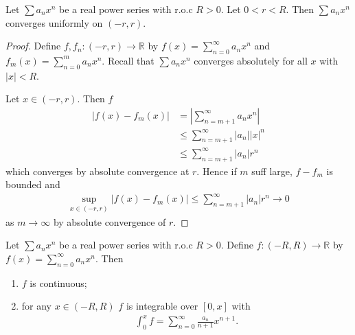     \begin{lemma} \label{lem:8}
        Let $\sum a_n x^n$ be a real power series with r.o.c $R > 0$.
        Let $0 < r < R$.
        Then $\sum a_n x^n$ converges uniformly on $(-r, r)$.
    \end{lemma} 

    \begin{proof}
        Define $f, f_n : (-r, r) \to \mathbb{R}$ by $f(x) = \sum_{n=0}^{\infty} a_n x^n$ and $f_m(x) = \sum_{n=0}^{m} a_n x^n$.
        Recall that $\sum a_n x^n$ converges absolutely for all $x$ with $|x| < R$.

        Let $x \in (-r, r)$.
        Then $f$
        \begin{align*}
            |f(x) - f_m(x)| &= \left| \sum_{n=m+1}^{\infty} a_n x^n \right| \\
            &\leq \sum_{n=m+1}^{\infty} |a_n| |x|^n \\
            &\leq \sum_{n=m+1}^{\infty} |a_n| r^n
        \end{align*} which converges by absolute convergence at $r$.
        Hence if $m$ suff large, $f - f_m$ is bounded and 
        \begin{align*}
            \sup_{x \in (-r, r)} |f(x) - f_m(x)| \leq \sum_{n=m+1}^{\infty} |a_n| r^n \to 0
        \end{align*} as $m \to \infty$ by absolute convergence of $r$.
    \end{proof} 

    \begin{theorem} \label{thm:9}
        Let $\sum a_n x^n$ be a real power series with r.o.c $R > 0$.
        Define $f : (-R, R) \to \mathbb{R}$ by $f(x) = \sum_{n=0}^{\infty} a_n x^n$.
        Then 
        \begin{enumerate}
            \item $f$ is continuous;
            \item for any $x \in (-R, R)$ $f$ is integrable over $[0, x]$ with 
            \begin{align*}
                \int_0^x f = \sum_{n=0}^{\infty} \frac{a_n}{n + 1} x^{n + 1}.
            \end{align*} 
        \end{enumerate} 
    \end{theorem} 


